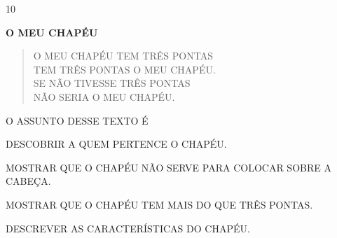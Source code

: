


\num{10}

\textbf{O MEU CHAPÉU}

\begin{verse}
O MEU CHAPÉU TEM TRÊS PONTAS\\
TEM TRÊS PONTAS O MEU CHAPÉU.\\
SE NÃO TIVESSE TRÊS PONTAS\\
NÃO SERIA O MEU CHAPÉU.

\end{verse}


O ASSUNTO DESSE TEXTO É

\begin{escolha}
\item DESCOBRIR A QUEM PERTENCE O CHAPÉU.

\item MOSTRAR QUE O CHAPÉU NÃO SERVE PARA COLOCAR SOBRE A CABEÇA.

\item MOSTRAR QUE O CHAPÉU TEM MAIS DO QUE TRÊS PONTAS.

\item DESCREVER AS CARACTERÍSTICAS DO CHAPÉU.
\end{escolha}



